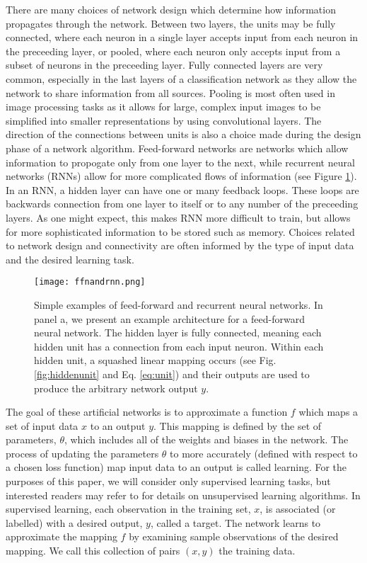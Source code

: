 \documentclass[12pt]{article}
\begin{document}
\indent There are many choices of network design which determine how information propagates through the network. Between two layers, the units may be fully connected, where each neuron in a single layer accepts input from each neuron in the preceeding layer, or pooled, where each neuron only accepts input from a subset of neurons in the preceeding layer. Fully connected layers are very common, especially in the last layers of a classification network as they allow the network to share information from all sources. Pooling is most often used in image processing tasks as it allows for large, complex input images to be simplified into smaller representations by using convolutional layers. The direction of the connections between units is also a choice made during the design phase of a network algorithm. Feed-forward networks are networks which allow information to propogate only from one layer to the next, while recurrent neural networks (RNNs) allow for more complicated flows of information (see Figure \ref{fig:ffnandrnn}). In an RNN, a hidden layer can have one or many feedback loops. These loops are backwards connection from one layer to itself or to any number of the preceeding layers. As one might expect, this makes RNN more difficult to train, but allows for more sophisticated information to be stored such as memory. Choices related to network design and connectivity are often informed by the type of input data and the desired learning task.  \\
\begin{figure}
  \centering
  \texttt{[image: ffnandrnn.png]}
  \caption{Simple examples of feed-forward and recurrent neural networks. In panel a, we present an example architecture for a feed-forward neural network. The hidden layer is fully connected, meaning each hidden unit has a connection from each input neuron. Within each hidden unit, a squashed linear mapping occurs (see Fig. \ref{fig:hiddenunit} and Eq. \ref{eq:unit}) and their outputs are used to produce the arbitrary network output $y$.}
  \label{fig:ffnandrnn}
\end{figure}
\indent The goal of these artificial networks is to approximate a function $f$ which maps a set of input data $x$ to an output $y$. This mapping is defined by the set of parameters, $\theta$, which includes all of the weights and biases in the network. The process of updating the parameters $\theta$ to more accurately (defined with respect to a chosen loss function) map input data to an output is called learning. For the purposes of this paper, we will consider only supervised learning tasks, but interested readers may refer to \cite{bengio} for details on unsupervised learning algorithms. In supervised learning, each observation in the training set, $x$, is associated (or labelled) with a desired output, $y$, called a target. The network learns to approximate the mapping $f$ by examining sample observations of the desired mapping. We call this collection of pairs $(x,y)$ the training data. \\
\end{document}
